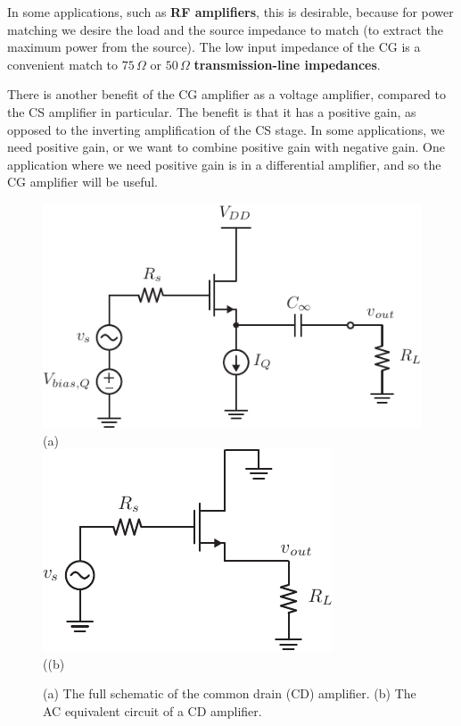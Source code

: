In some applications, such as \textbf{RF amplifiers}, this is desirable, because for power matching we desire the load and the source impedance to match (to extract the maximum power from the source).  The low input impedance of the CG is a convenient match to $75\,\Omega$ or $50\,\Omega$ \textbf{transmission-line impedances}.

There is another benefit of the CG amplifier as a voltage amplifier, compared to the CS amplifier in particular.  The benefit is that it has a positive gain, as opposed to the inverting amplification of the CS stage.  In some applications, we need positive gain, or we want to combine positive gain with negative gain.  One application where we need positive gain is in a differential amplifier, and so the CG amplifier will be useful.
\newpage
\begin{figure}[t]
\centering
\includegraphics[scale=1.15]{cd_amp_dc}\\
(a)\\[0.15cm]
\includegraphics[scale=1.25]{cd_amp_ac}\\
((b)\\
\caption{(a) The full schematic of the common drain (CD) amplifier.  (b) The AC equivalent circuit of a CD amplifier.}
\label{fig:cd_amp_dc_ac}
\end{figure}
